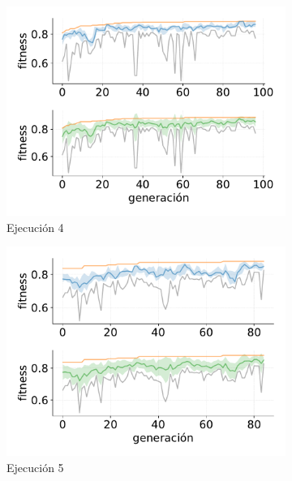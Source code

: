 \begin{figure}[p]
\begin{subfigure}{0.47\textwidth}
        \includegraphics[width=\textwidth]{figuras/experimentos/exp9/ind_4.pdf}
        \caption{Ejecución 4}
    \end{subfigure}
    \hfill
    \begin{subfigure}{0.47\textwidth}
        \centering
        \includegraphics[width=\textwidth]{figuras/experimentos/exp9/ind_5.pdf}
        \caption{Ejecución 5}
    \end{subfigure}
    \hfill
    \begin{subfigure}{0.47\textwidth}
        \centering

\end{subfigure}
\end{figure}
